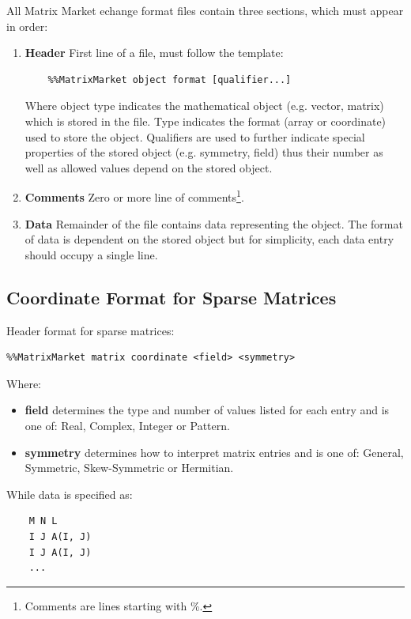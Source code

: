 \documentclass[thesis=M,english]{FITthesis}[2019/12/23]
\begin{document}
All Matrix Market echange format files contain three sections, which must appear in order:

\begin{enumerate}
    \item \textbf{Header} First line of a file, must follow the template:
          \begin{lstlisting}
    %%MatrixMarket object format [qualifier...]
\end{lstlisting}
          Where object type indicates the mathematical object (e.g. vector, matrix) which is
          stored in the file. Type indicates the format (array or coordinate) used to store
          the object. Qualifiers are used to further indicate special properties of the stored
          object (e.g. symmetry, field) thus their number as well as allowed values depend on
          the stored object.
    \item \textbf{Comments} Zero or more line of comments\footnote{Comments are lines starting with \%.}.
    \item \textbf{Data} Remainder of the file contains data representing the object.
          The format of data is dependent on the stored object but for simplicity,
          each data entry should occupy a single line.
\end{enumerate}

\subsection{Coordinate Format for Sparse Matrices}

Header format for sparse matrices:
\begin{lstlisting}
%%MatrixMarket matrix coordinate <field> <symmetry>
\end{lstlisting}

Where:
\begin{itemize}
    \item \textbf{field} determines the type and number of values listed for each entry
          and is one of: Real, Complex, Integer or Pattern.
    \item \textbf{symmetry} determines how to interpret matrix entries
          and is one of: General, Symmetric, Skew-Symmetric or Hermitian.
\end{itemize}

While data is specified as:
\begin{lstlisting}
    M N L
    I J A(I, J)
    I J A(I, J)
    ...
\end{lstlisting}
\end{document}
